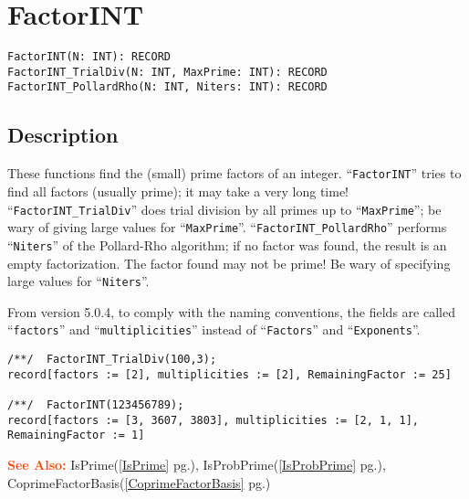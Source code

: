 \documentclass[a4paper]{mybook}
\newenvironment{command}{}{} %
\newcommand\SeeAlso{\par\textcolor{OrangeRed}{\textbf{\large See Also: }}}
\begin{document}
\section{FactorINT}
\label{FactorINT}
\begin{command} %


\begin{Verbatim}[label=syntax, rulecolor=\color{MidnightBlue},
frame=single]
FactorINT(N: INT): RECORD
FactorINT_TrialDiv(N: INT, MaxPrime: INT): RECORD
FactorINT_PollardRho(N: INT, Niters: INT): RECORD
\end{Verbatim}


\subsection*{Description}

These functions find the (small) prime factors of an integer.  ``\verb&FactorINT&'' 
tries to find all factors (usually prime); it may take a very long time!
``\verb&FactorINT_TrialDiv&'' does trial division by all primes up to ``\verb&MaxPrime&'';
be wary of giving large values for ``\verb&MaxPrime&''.
``\verb&FactorINT_PollardRho&'' performs ``\verb&Niters&'' of the Pollard-Rho algorithm;
if no factor was found, the result is an empty factorization.  The factor
found may not be prime!  Be wary of specifying large values for ``\verb&Niters&''.
\par 
From version 5.0.4, to comply with the naming conventions, the fields are
called ``\verb&factors&'' and ``\verb&multiplicities&'' instead of ``\verb&Factors&''
and ``\verb&Exponents&''.
\begin{Verbatim}[label=example, rulecolor=\color{PineGreen}, frame=single]
/**/  FactorINT_TrialDiv(100,3);
record[factors := [2], multiplicities := [2], RemainingFactor := 25]

/**/  FactorINT(123456789);
record[factors := [3, 3607, 3803], multiplicities := [2, 1, 1], RemainingFactor := 1]
\end{Verbatim}


\SeeAlso %
  IsPrime(\ref{IsPrime} pg.\pageref{IsPrime}), 
    IsProbPrime(\ref{IsProbPrime} pg.\pageref{IsProbPrime}), 
    CoprimeFactorBasis(\ref{CoprimeFactorBasis} pg.\pageref{CoprimeFactorBasis})
\end{command} %
\end{document}
